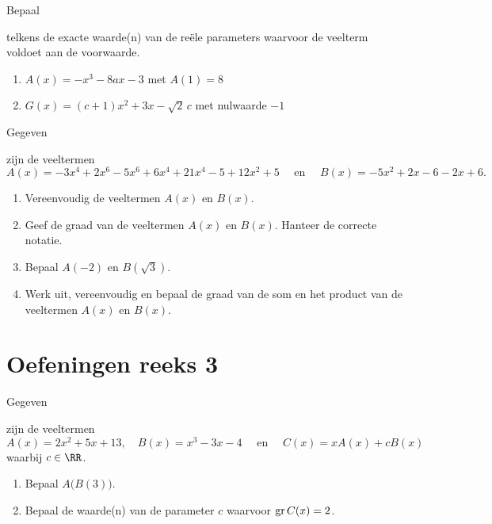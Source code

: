 \documentclass{ximera}
\begin{document}
\begin{Oefening}\setcounter{enumi}{10} 
\hypertarget{oef1.10}{Bepaal} telkens de exacte waarde(n) van de re\"ele parameters waarvoor de veelterm voldoet aan de voorwaarde. 
\begin{enumerate}

\item
$A(x) = -x^3-8ax-3$  %
met $A(1) = 8$ 
\item
$G(x) = (c+1)x^2+3x-\sqrt{2}\,c$ %
met nulwaarde $-1$
\end{enumerate}
\end{Oefening}

\begin{Oefening}\setcounter{enumi}{11} 
\hypertarget{oef1.11}{Gegeven} zijn de veeltermen 
\[
A(x) = -3x^4+2x^6-5x^6+6x^4+21x^4-5+12x^2+5 \quad \text{ en } \quad B(x) = -5x^2+2x-6-2x+6.
\]
\begin{enumerate}

\item
Vereenvoudig de veeltermen $A(x)$ en $B(x)$.
\item
Geef de graad van de veeltermen $A(x)$ en $B(x)$. Hanteer de correcte notatie.
\item
Bepaal $A(-2)$ en $B(\sqrt{3})$. 
\item
Werk uit, vereenvoudig en bepaal de graad van de som en het product van de veeltermen $A(x)$ en $B(x)$. 
\end{enumerate}
\end{Oefening}


\section*{Oefeningen reeks 3}

\begin{Oefening}\setcounter{enumi}{12}
\hypertarget{oef1.12}{Gegeven} zijn de veeltermen 
\[
A(x) = 2x^2 + 5x + 13, \quad B(x) =  x^3-3x-4  \quad \text{ en } \quad C(x) = xA(x) + cB(x)
\]
waarbij $c \in \RR$.
\begin{enumerate}

\item
Bepaal $A\bigl(B(3)\bigr)$.
\item
Bepaal de waarde(n) van de parameter $c$ waarvoor $\operatorname{gr} C(x) = 2$.
\end{enumerate}
\end{Oefening}
\end{document}
